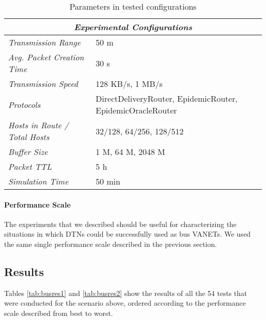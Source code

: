 \begin{table}[htpb]
\centering
    \begin{tabular}{@{}p{}p{}@{}}
        \toprule
        \multicolumn{2}{c}{\textit{Experimental Configurations}} \\ \midrule
        \textit{Transmission Range} &  50 m \\
        \addlinespace
        \textit{Avg. Packet Creation Time} & 30 s  \\
        \addlinespace
        \textit{Transmission Speed} & 128 KB/s, 1 MB/s \\
        \addlinespace
        \textit{Protocols} & DirectDeliveryRouter, EpidemicRouter, EpidemicOracleRouter \\
        \addlinespace
        \textit{Hosts in Route / Total Hosts} &  32/128, 64/256, 128/512 \\
        \addlinespace
        \textit{Buffer Size} & 1 M, 64 M, 2048 M \\
        \addlinespace
        \textit{Packet TTL} &  5 h \\
        \addlinespace
        \textit{Simulation Time} &  50 min\\ \bottomrule
    \end{tabular}
    \caption{Parameters in tested configurations}
    \label{tab:busparams}
\end{table}

\paragraph{Performance Scale}

The experiments that we described should be useful for characterizing the
situations in which DTNs could be successfully used as bus VANETs. We used the
same single performance scale described in the previous section.

\subsection{Results}

Tables \ref{tab:busres1} and \ref{tab:busres2} show the results of all the 54
tests that were conducted for the scenario above, ordered according to the
performance scale described from best to worst.

